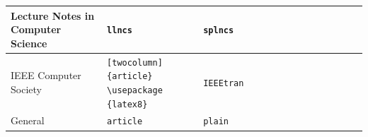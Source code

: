 \documentclass{styles/llncs}
\begin{document}
\begin{xtabular}{
		p{0.27\linewidth}
		p{0.27\linewidth}
		p{0.23\linewidth}
		m{0.23\linewidth}
	}
	Lecture Notes in Computer Science& \Verb|llncs|& \Verb|splncs|&  \\ 
	\midrule
	IEEE Computer Society                             & {\Verb|[twocolumn]| \verb|{article}|  \Verb|\usepackage|  \Verb|{latex8}|} & \Verb|IEEEtran|                &  \\ 
	\midrule
	General & \Verb|article|  & \Verb|plain|  &  \\ 
	\bottomrule
\end{xtabular}
\end{document}
